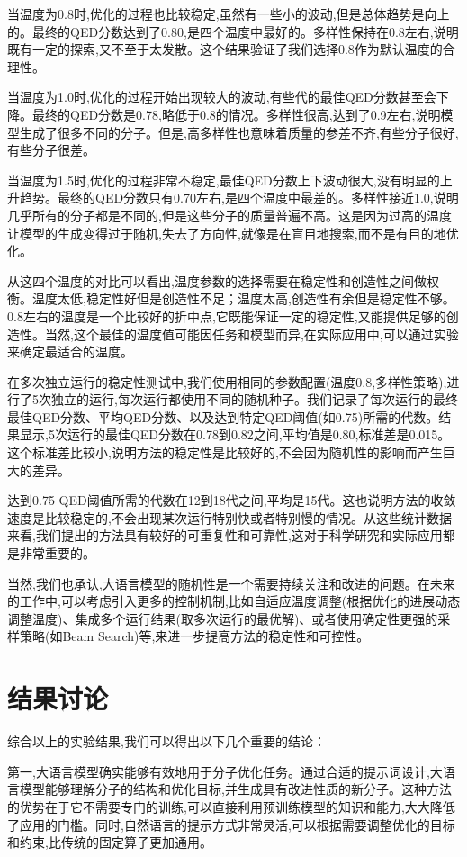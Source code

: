 当温度为0.8时,优化的过程也比较稳定,虽然有一些小的波动,但是总体趋势是向上的。最终的QED分数达到了0.80,是四个温度中最好的。多样性保持在0.8左右,说明既有一定的探索,又不至于太发散。这个结果验证了我们选择0.8作为默认温度的合理性。

当温度为1.0时,优化的过程开始出现较大的波动,有些代的最佳QED分数甚至会下降。最终的QED分数是0.78,略低于0.8的情况。多样性很高,达到了0.9左右,说明模型生成了很多不同的分子。但是,高多样性也意味着质量的参差不齐,有些分子很好,有些分子很差。

当温度为1.5时,优化的过程非常不稳定,最佳QED分数上下波动很大,没有明显的上升趋势。最终的QED分数只有0.70左右,是四个温度中最差的。多样性接近1.0,说明几乎所有的分子都是不同的,但是这些分子的质量普遍不高。这是因为过高的温度让模型的生成变得过于随机,失去了方向性,就像是在盲目地搜索,而不是有目的地优化。

从这四个温度的对比可以看出,温度参数的选择需要在稳定性和创造性之间做权衡。温度太低,稳定性好但是创造性不足；温度太高,创造性有余但是稳定性不够。0.8左右的温度是一个比较好的折中点,它既能保证一定的稳定性,又能提供足够的创造性。当然,这个最佳的温度值可能因任务和模型而异,在实际应用中,可以通过实验来确定最适合的温度。

在多次独立运行的稳定性测试中,我们使用相同的参数配置(温度0.8,多样性策略),进行了5次独立的运行,每次运行都使用不同的随机种子。我们记录了每次运行的最终最佳QED分数、平均QED分数、以及达到特定QED阈值(如0.75)所需的代数。结果显示,5次运行的最佳QED分数在0.78到0.82之间,平均值是0.80,标准差是0.015。这个标准差比较小,说明方法的稳定性是比较好的,不会因为随机性的影响而产生巨大的差异。

达到0.75 QED阈值所需的代数在12到18代之间,平均是15代。这也说明方法的收敛速度是比较稳定的,不会出现某次运行特别快或者特别慢的情况。从这些统计数据来看,我们提出的方法具有较好的可重复性和可靠性,这对于科学研究和实际应用都是非常重要的。

当然,我们也承认,大语言模型的随机性是一个需要持续关注和改进的问题。在未来的工作中,可以考虑引入更多的控制机制,比如自适应温度调整(根据优化的进展动态调整温度)、集成多个运行结果(取多次运行的最优解)、或者使用确定性更强的采样策略(如Beam Search)等,来进一步提高方法的稳定性和可控性。

\section{结果讨论}

综合以上的实验结果,我们可以得出以下几个重要的结论：

第一,大语言模型确实能够有效地用于分子优化任务。通过合适的提示词设计,大语言模型能够理解分子的结构和优化目标,并生成具有改进性质的新分子。这种方法的优势在于它不需要专门的训练,可以直接利用预训练模型的知识和能力,大大降低了应用的门槛。同时,自然语言的提示方式非常灵活,可以根据需要调整优化的目标和约束,比传统的固定算子更加通用。

